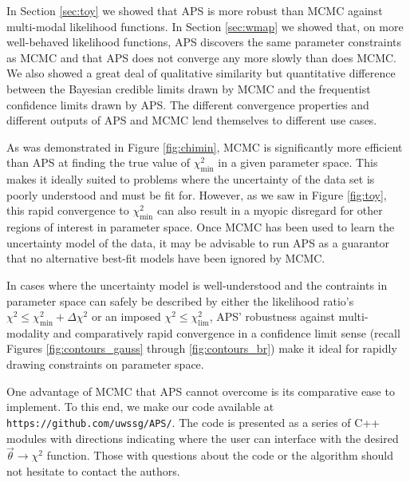 \documentclass[useAMS,usenatbib]{aastex}
\begin{document}
In Section \ref{sec:toy} we showed that APS is more robust
than MCMC against multi-modal likelihood functions.
In Section \ref{sec:wmap} we showed that, on more well-behaved
likelihood functions, APS discovers the same parameter constraints
as MCMC and that APS does not converge any more slowly than does MCMC.
We also showed a great deal of qualitative similarity but quantitative
difference between the Bayesian credible limits drawn by MCMC
and the frequentist confidence limits drawn by APS.  The different
convergence properties and different outputs of APS and MCMC lend themselves
to different use cases.

As was demonstrated in Figure \ref{fig:chimin}, MCMC is significantly
more efficient than APS at finding the true value of $\chi^2_\text{min}$
in a given parameter space.  This makes it ideally suited to problems where
the uncertainty of the data set is poorly understood and must be fit
for.  However, as we saw in Figure \ref{fig:toy}, this rapid convergence to
$\chi^2_\text{min}$ can also result in a myopic disregard for other regions of
interest in parameter space.  Once MCMC has been used to learn the uncertainty
model of the data, it may be advisable to run APS as a guarantor that no
alternative best-fit models have been ignored by MCMC.

In cases where the uncertainty model is well-understood and the contraints in
parameter space can safely be described by either the likelihood ratio's
$\chi^2\le\chi^2_\text{min}+\Delta\chi^2$ or an imposed
$\chi^2\le\chi^2_\text{lim}$, APS' robustness against multi-modality and
comparatively rapid convergence in a confidence limit sense (recall Figures
\ref{fig:contours_gauss} through \ref{fig:contours_br}) make it ideal for rapidly
drawing constraints on parameter space.

One advantage of MCMC that APS cannot overcome is its comparative ease to
implement.  To this end,
we make our code available at \verb|https://github.com/uwssg/APS/|.  
The code is presented as a series of C++ modules with directions
indicating where the user can interface with 
the desired $\vec{\theta}\rightarrow\chi^2$ function.  
Those with questions about the code or the algorithm should not
hesitate to contact the authors.

\end{document}
